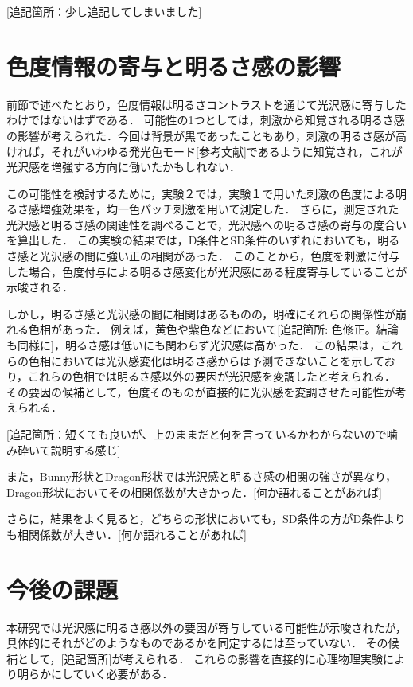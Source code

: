         [追記箇所：少し追記してしまいました]

    \section{色度情報の寄与と明るさ感の影響}
        前節で述べたとおり，色度情報は明るさコントラストを通じて光沢感に寄与したわけではないはずである．
        可能性の1つとしては，刺激から知覚される明るさ感の影響が考えられた．今回は背景が黒であったこともあり，刺激の明るさ感が高ければ，それがいわゆる発光色モード[参考文献]であるように知覚され，これが光沢感を増強する方向に働いたかもしれない．
        
        この可能性を検討するために，実験２では，実験１で用いた刺激の色度による明るさ感増強効果を，均一色パッチ刺激を用いて測定した．
        さらに，測定された光沢感と明るさ感の関連性を調べることで，光沢感への明るさ感の寄与の度合いを算出した．
        この実験の結果では，D条件とSD条件のいずれにおいても，明るさ感と光沢感の間に強い正の相関があった．
        このことから，色度を刺激に付与した場合，色度付与による明るさ感変化が光沢感にある程度寄与していることが示唆される．

        しかし，明るさ感と光沢感の間に相関はあるものの，明確にそれらの関係性が崩れる色相があった．
        例えば，黄色や紫色などにおいて[追記箇所: 色修正。結論も同様に]，明るさ感は低いにも関わらず光沢感は高かった．
        この結果は，これらの色相においては光沢感変化は明るさ感からは予測できないことを示しており，これらの色相では明るさ感以外の要因が光沢感を変調したと考えられる．
        その要因の候補として，色度そのものが直接的に光沢感を変調させた可能性が考えられる．

        [追記箇所：短くても良いが、上のままだと何を言っているかわからないので噛み砕いて説明する感じ]
        
        また，Bunny形状とDragon形状では光沢感と明るさ感の相関の強さが異なり，Dragon形状においてその相関係数が大きかった．[何か語れることがあれば]
        
        さらに，結果をよく見ると，どちらの形状においても，SD条件の方がD条件よりも相関係数が大きい．[何か語れることがあれば]
        

    \section{今後の課題}
        本研究では光沢感に明るさ感以外の要因が寄与している可能性が示唆されたが，具体的にそれがどのようなものであるかを同定するには至っていない．
        その候補として，[追記箇所]が考えられる．
        これらの影響を直接的に心理物理実験により明らかにしていく必要がある．

